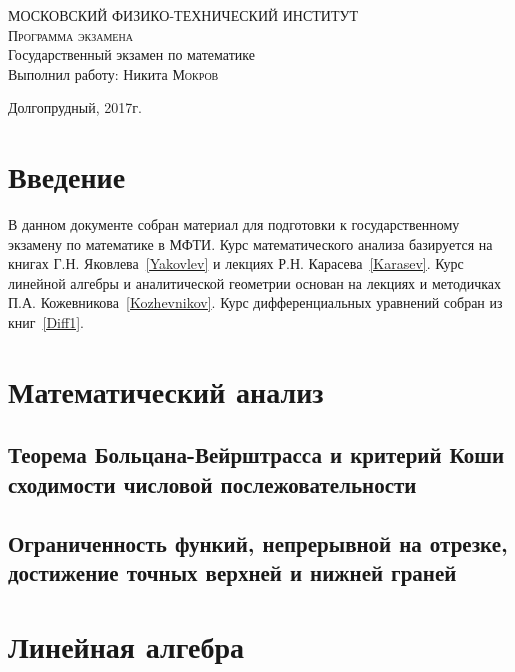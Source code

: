 \documentclass{urticle}
\begin{document}
\begin{titlepage}

    \begin{center}
        \large МОСКОВСКИЙ ФИЗИКО-ТЕХНИЧЕСКИЙ ИНСТИТУТ
        \vspace{2cm}\\
        \textsc{Программа экзамена}
        \vspace{8cm}\\
        \LARGE Государственный экзамен по математике
        \vspace{3cm}\\
        \large Выполнил работу: Никита \textsc{Мокров}
    \end{center}

    \vfill
    \center Долгопрудный, 2017г.
\end{titlepage}

\tableofcontents
\newpage

\section{Введение}
\label{Intro}
    В данном документе собран материал для подготовки к государственному экзамену по математике в МФТИ. Курс математического анализа базируется на книгах Г.Н. Яковлева~\ref{Yakovlev} и лекциях Р.Н. Карасева~\ref{Karasev}. Курс линейной алгебры и аналитической геометрии основан на лекциях и методичках П.А. Кожевникова~\ref{Kozhevnikov}. Курс дифференциальных уравнений собран из книг~\ref{Diff1}.

\section{Математический анализ}
\label{MathAnalysis}

\subsection{Теорема Больцана-Вейрштрасса и критерий Коши сходимости числовой послежовательности}

\subsection{Ограниченность функий, непрерывной на отрезке, достижение точных верхней и нижней граней}




\section{Линейная алгебра}
\label{LinAlgebra}
\end{document}
